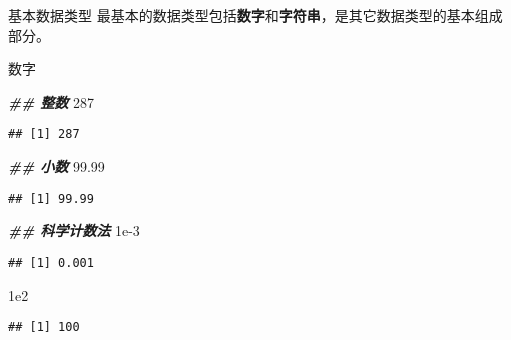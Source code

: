 \documentclass[ignorenonframetext,]{beamer}
\newenvironment{Shaded}{\begin{snugshade}}{\end{snugshade}}
\newcommand{\DecValTok}[1]{\textcolor[rgb]{0.00,0.00,0.81}{#1}}
\newcommand{\DocumentationTok}[1]{\textcolor[rgb]{0.56,0.35,0.01}{\textbf{\textit{#1}}}}
\newcommand{\FloatTok}[1]{\textcolor[rgb]{0.00,0.00,0.81}{#1}}
\newcommand\FontSmall{\fontsize{7}{8}\selectfont}
\begin{document}
\begin{frame}[fragile]{基本数据类型}
\protect\hypertarget{ux57faux672cux6570ux636eux7c7bux578b}{}
最基本的数据类型包括\textbf{数字}和\textbf{字符串}，是其它数据类型的基本组成部分。

数字

\FontSmall

\begin{Shaded}
\begin{Highlighting}[]
\DocumentationTok{\#\# 整数}
\DecValTok{287}
\end{Highlighting}
\end{Shaded}

\begin{verbatim}
## [1] 287
\end{verbatim}

\begin{Shaded}
\begin{Highlighting}[]
\DocumentationTok{\#\# 小数}
\FloatTok{99.99}
\end{Highlighting}
\end{Shaded}

\begin{verbatim}
## [1] 99.99
\end{verbatim}

\begin{Shaded}
\begin{Highlighting}[]
\DocumentationTok{\#\# 科学计数法}
\FloatTok{1e{-}3}
\end{Highlighting}
\end{Shaded}

\begin{verbatim}
## [1] 0.001
\end{verbatim}

\begin{Shaded}
\begin{Highlighting}[]
\FloatTok{1e2}
\end{Highlighting}
\end{Shaded}

\begin{verbatim}
## [1] 100
\end{verbatim}
\end{frame}
\end{document}
